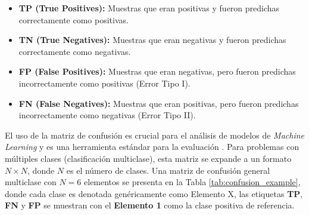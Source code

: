 \begin{itemize}
    \item \textbf{TP (True Positives):} Muestras que eran positivas y fueron predichas correctamente como positivas.
    \item \textbf{TN (True Negatives):} Muestras que eran negativas y fueron predichas correctamente como negativas.
    \item \textbf{FP (False Positives):} Muestras que eran negativas, pero fueron predichas incorrectamente como positivas (Error Tipo I).
    \item \textbf{FN (False Negatives):} Muestras que eran positivas, pero fueron predichas incorrectamente como negativas (Error Tipo II).
\end{itemize}

El uso de la matriz de confusión es crucial para el análisis de modelos de \textit{Machine Learning} y es una herramienta estándar para la evaluación \cite{ref44}. Para problemas con múltiples clases (clasificación multiclase), esta matriz se expande a un formato $N \times N$, donde $N$ es el número de clases. Una matriz de confusión general multiclase con $N=6$ elementos se presenta en la Tabla \ref{tab:confusion_example}, donde cada clase es denotada genéricamente como Elemento X, las etiquetas \textbf{TP}, \textbf{FN} y \textbf{FP} se muestran con el \textbf{Elemento 1} como la clase positiva de referencia.


